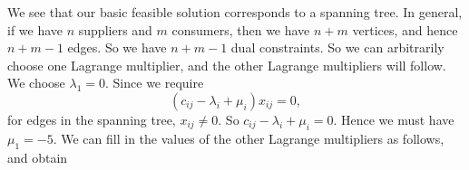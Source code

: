 \documentclass[a4paper]{article}
\begin{document}
\begin{eg}
\begin{center}
  \end{center}
  We see that our basic feasible solution corresponds to a spanning tree. In general, if we have $n$ suppliers and $m$ consumers, then we have $n + m$ vertices, and hence $n + m - 1$ edges. So we have $n + m - 1$ dual constraints. So we can arbitrarily choose one Lagrange multiplier, and the other Lagrange multipliers will follow. We choose $\lambda_1 = 0$. Since we require
  \[
    (c_{ij} - \lambda_i + \mu_i)x_{ij} = 0,
  \]
  for edges in the spanning tree, $x_{ij} \not= 0$. So $c_{ij} - \lambda_i + \mu_i = 0$. Hence we must have $\mu_1 = -5$. We can fill in the values of the other Lagrange multipliers as follows, and obtain


\end{eg}
\end{document}

